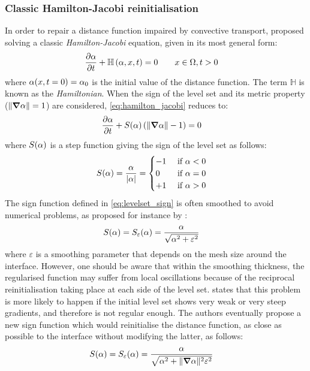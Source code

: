 \subsubsection{Classic Hamilton-Jacobi reinitialisation}
%
In order to repair a distance function impaired by convective transport, \citet{sussman_level_1994} proposed 
solving a classic \emph{Hamilton-Jacobi} equation, given in its most general form:
\begin{align}
\label{eq:hamilton_jacobi}
& \frac{\partial \alpha}{\partial t} + \mathbb{H} \left( \alpha,x,t \right) = 0 \qquad x \in \Omega, t>0
\end{align}
where $\alpha (x,t=0) = \alpha _0$ is the initial value of the distance function. 
The term $\mathbb{H}$ is known as the \emph{Hamiltonian}. When the sign of the level set and its metric 
property ($\lVert \boldsymbol{\nabla} \alpha \rVert=1$) are considered, \cref{eq:hamilton_jacobi} reduces to:
\begin{align}
\label{eq:reinit_classic}
& \frac{\partial \alpha}{\partial t}  + S(\alpha) \left( \lVert \boldsymbol{\nabla} \alpha \rVert - 1 \right) = 0
\end{align}
where $S(\alpha)$ is a step function giving the sign of the level set as follows:
\begin{align}
\label{eq:levelset_sign}
& S(\alpha) = \frac{\alpha}{\left | \alpha \right |} = 
\begin{cases}
 -1 	& \text{ if } \alpha < 0 \\ 
 0	 	& \text{ if } \alpha = 0 \\ 
 +1 	& \text{ if } \alpha > 0 
\end{cases}
\end{align}
The sign function defined in \cref{eq:levelset_sign} is often smoothed to avoid numerical problems, 
as proposed for instance by \citet{sussman_level_1994}:
\begin{align}
\label{eq:levelset_sign_smoothed}
& S(\alpha) = S_\varepsilon (\alpha) = \frac{\alpha}{\sqrt{\alpha^2 + \varepsilon^2}}
\end{align}
where $\varepsilon$ is a smoothing parameter that depends on the mesh size around the interface. 
However, one should be aware that within the smoothing thickness, the regularised function may suffer 
from local oscillations because of the reciprocal reinitialisation taking place at each side of the level 
set. \citet{peng_pde-based_1999} states that this problem is more likely to happen if the initial level set
shows very weak or very steep gradients, and therefore is not regular enough. The authors eventually propose
a new sign function which would reinitialise the distance function, as close as possible to the interface
without modifying the latter, as follows:
\begin{align}
\label{eq:levelset_sign_smoothed2}
& S(\alpha) = S_\varepsilon (\alpha) = \frac{\alpha}{\sqrt{\alpha^2 + \lVert \boldsymbol{\nabla} \alpha \rVert^2 \varepsilon^2}}
\end{align}
%
